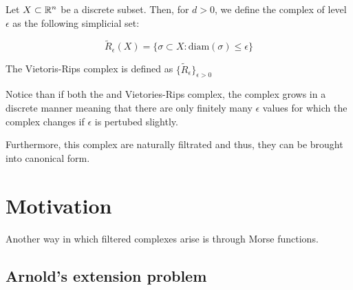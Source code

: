 \begin{definition}
Let $X\subset \mathbb{R}^n$ be a discrete subset. Then, for $d>0$, we define the \Cech
complex of level $\epsilon$ as the following simplicial set:

$$
\tilde{R}_\epsilon(X)
=
\{
\sigma \subset X :
\text{diam}(\sigma)\leq \epsilon
\}
$$

\end{definition}

The Vietoris-Rips complex is defined as $\{\tilde{R}_\epsilon\}_{\epsilon>0}$

\begin{remark}
Notice than if both the {\Cech} and Vietories-Rips complex, the complex grows in a discrete manner meaning
that there are only finitely many $\epsilon$ values for which the complex changes if $\epsilon$ is pertubed slightly.

Furthermore, this complex are naturally filtrated and thus, they can be brought into canonical form.
\end{remark}

\section{Motivation}

Another way in which filtered complexes arise is through Morse functions.

\subsection{Arnold's extension problem}



